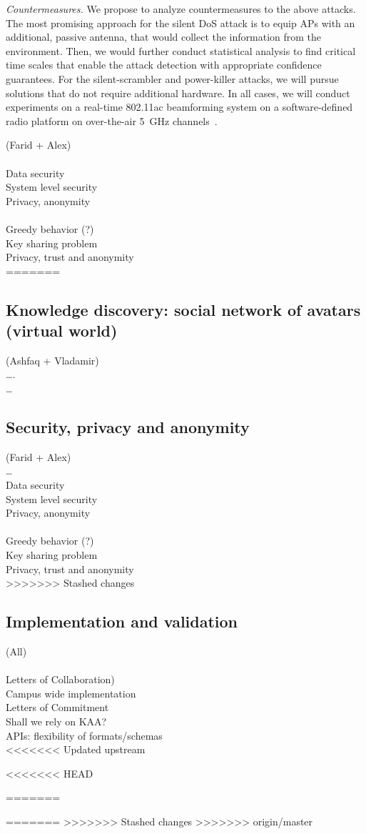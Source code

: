 \emph{Countermeasures.} We propose to analyze countermeasures to the above attacks. The most promising approach for the silent DoS attack is to equip APs with an additional, passive antenna, that would collect the information from the environment. Then, we would further conduct statistical analysis to find critical time scales that enable the attack detection with appropriate confidence guarantees. For the silent-scrambler and power-killer attacks, we will pursue solutions that do not require additional hardware. In all cases, we will conduct experiments on a real-time 802.11ac beamforming system on a software-defined radio
platform on over-the-air 5~GHz channels~\cite{warpProject}.



(Farid + Alex)\\
\\
Data security\\
System level security\\
Privacy, anonymity\\
\\
Greedy behavior (?)\\
Key sharing problem\\
Privacy, trust and anonymity \\

=======
\subsection{Knowledge discovery: social network of avatars (virtual world)}
(Ashfaq + Vladamir)\\
….\\
…\\

\subsection{Security, privacy and anonymity}
(Farid + Alex)\\
…\\
Data security\\
System level security\\
Privacy, anonymity\\
\\
Greedy behavior (?)\\
Key sharing problem\\ 
Privacy, trust and anonymity \\

>>>>>>> Stashed changes
\subsection{Implementation and validation }
(All)\\
\\
Letters of Collaboration)\\
Campus wide implementation \\
Letters of Commitment\\
Shall we rely on KAA?\\
APIs: flexibility of formats/schemas\\
<<<<<<< Updated upstream

<<<<<<< HEAD

=======
 
=======
>>>>>>> Stashed changes
>>>>>>> origin/master
